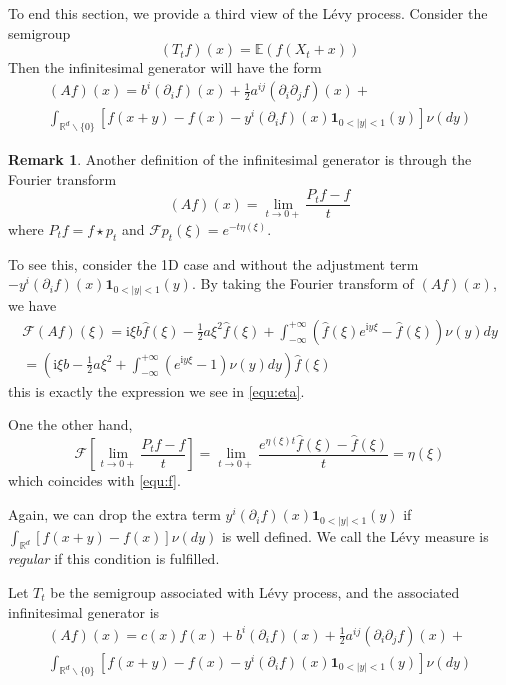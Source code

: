 \documentclass[3p,,preprint,12pt]{elsarticle}
\newcommand{\ii}[0]{\mathrm{i}}
\newcommand{\RR}[0]{\mathbb{R}}
\theoremstyle{definition}
\newtheorem{remark}{Remark}
\begin{document}
To end this section, we provide a third view of the L\'evy process. Consider the semigroup 
\begin{equation}
	(T_tf)(x) = \mathbb{E}(f(X_t+x))
\end{equation}
Then the infinitesimal generator will have the form
\begin{multline}\label{equ:Af}
	(Af)(x) =  b^i(\partial_i f)(x) + \frac{1}{2}a^{ij}(\partial_i \partial_j f)(x) +\\
	\int_{\RR^d\backslash\{0\}} [f(x+y)-f(x)-y^i(\partial_i f)(x) \mathbf{1}_{0<|y|<1}(y)]\nu(dy)
\end{multline}

\begin{remark}
	Another definition of the infinitesimal generator is through the Fourier transform 
	\begin{equation}
		(Af)(x) = \lim_{t\rightarrow 0+} \frac{P_t f-f}{t}
	\end{equation}
	where $P_tf = f\star p_t$ and $\mathcal{F}p_t(\xi) = e^{-t\eta(\xi)}$. 
	
	To see this, consider the 1D case and without the adjustment term $-y^i(\partial_i f)(x) \mathbf{1}_{0<|y|<1}(y)$. By taking the Fourier transform of $(Af)(x)$, we have 
	\begin{multline}\label{equ:f}
		\mathcal{F}(Af)(\xi) = \ii\xi b\hat f(\xi ) - \frac{1}{2}a{\xi ^2}\hat f(\xi ) + \int_{ - \infty }^{ + \infty } {(\hat f(\xi ){e^{\ii y\xi }} - \hat f(\xi ))\nu (y)dy} \\
		=\left( {\ii\xi b - \frac{1}{2}a{\xi ^2} + \int_{ - \infty }^{ + \infty } {({e^{\ii y\xi }} - 1)\nu (y)dy} } \right)\hat f(\xi )
	\end{multline}
	this is exactly the expression we see in \cref{equ:eta}. 
	
	One the other hand, 
	\[\mathcal{F}\left[\mathop {\lim }\limits_{t \to 0 + } \frac{{{P_t}f - f}}{t}\right] = \mathop {\lim }\limits_{t \to 0 + } \frac{{{e^{\eta (\xi )t}}\hat f(\xi ) - \hat f(\xi )}}{t} = \eta (\xi )\]
	which coincides with \cref{equ:f}. 
	
\end{remark}

Again, we can drop the extra term $y^i(\partial_i f)(x) \mathbf{1}_{0<|y|<1}(y)$ if $\int_{\RR^d} [f(x+y)-f(x)]\nu(dy)$ is well defined. We call the L\'evy measure is \textit{regular} if this condition is fulfilled.


Let $T_t$ be the semigroup associated with L\'evy process, and the associated infinitesimal generator is
\begin{multline}\label{equ:Af2}
	(Af)(x) =  c(x) f(x) + b^i(\partial_i f)(x) + \frac{1}{2}a^{ij}(\partial_i \partial_j f)(x) +\\
	\int_{\RR^d\backslash\{0\}} [f(x+y)-f(x)-y^i(\partial_i f)(x) \mathbf{1}_{0<|y|<1}(y)]\nu(dy)
\end{multline}
\end{document}
